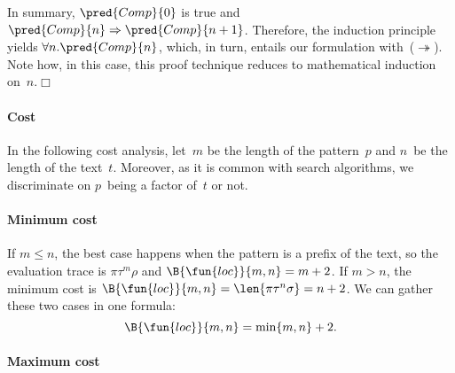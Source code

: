In summary, \(\pred{Comp}{0}\) is true and \(\pred{Comp}{n}
\Rightarrow \pred{Comp}{n+1}\). Therefore, the induction principle
yields \(\forall n.\pred{Comp}{n}\), which, in turn, entails our
formulation with~(\(\twoheadrightarrow\)). Note how, in this case,
this proof technique reduces to mathematical induction
on~\(n\).\hfill\(\Box\)

\paragraph{Cost}

In the following cost analysis, let~\(m\) be the length of the
pattern~\(p\) and \(n\)~be the length of the text~\(t\). Moreover, as
it is common with search algorithms, we discriminate on \(p\)~being a
factor of~\(t\) or not.

\paragraph{Minimum cost}

If \(m \leqslant n\), the best case happens when the pattern is a
prefix of the text, so the evaluation trace is \(\pi\tau^m\rho\) and
\(\B{\fun{loc}}{m,n} = m + 2\). If \(m > n \), the minimum cost is
\(\B{\fun{loc}}{m,n} = \len{\pi\tau^n\sigma} = n + 2\). We can gather
these two cases in one formula:
\begin{equation*}
\B{\fun{loc}}{m,n} = \min\{m,n\} + 2.\index{loc@$\B{\fun{loc}}{m,n}$}
\end{equation*}

\paragraph{Maximum cost}

